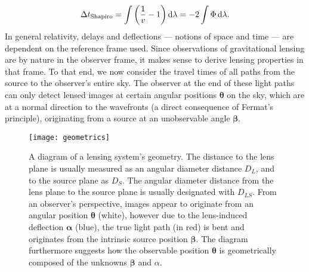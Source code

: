 %
%
\begin{equation}\eqlbl{shapiro}%
  \Delta t_{\text{Shapiro}} = \int \left(\frac{1}{v}-1\right)\mathrm{d}\lambda
   = -2\int\Phi\,\mathrm{d}\lambda.
\end{equation}%
%
In general relativity, delays and deflections --- notions of space and time ---
are dependent on the reference frame used.  Since observations of gravitational
lensing are by nature in the observer frame, it makes sense to derive lensing
properties in that frame.  To that end, we now consider the travel times of all
paths from the source to the observer's entire sky.  The observer at the end of these light paths can only detect
lensed images at certain angular positions $\bm\theta$ on the sky, which are at
a normal direction to the wavefronts (a direct consequence of Fermat's
principle), originating from a source at an unobservable angle $\bm\beta$.

\begin{figure}[h]%
  \centering%
  \texttt{[image: geometrics]}%
  \caption[Lensing geometrics]{A diagram of a lensing system's geometry.  The
  distance to the lens plane is usually measured as an angular diameter distance
  $D_{L}$, and to the source plane as $D_{S}$.  The angular diameter distance
  from the lens plane to the source plane is usually designated with $D_{LS}$.
  From an observer's perspective, images appear to originate from an angular
  position $\bm\theta$ (white), however due to the lens-induced deflection
  $\bm\alpha$ (blue), the true light path (in red) is bent and originates from
  the intrinsic source position $\bm\beta$.  The diagram furthermore suggests
  how the observable position $\bm\theta$ is geometrically composed of the
  unknowns $\bm\beta$ and $\alpha$.}%
\end{figure}%

